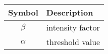 \begin{table}[h]
\begin{tabular}{c l}
		\hline
		\textbf{Symbol} & \textbf{Description}  \\
		\hline
		$\beta$ & intensity factor\\ 
		$\alpha$ & threshold value\\
		\hline
	\end{tabular}
\end{table} 
